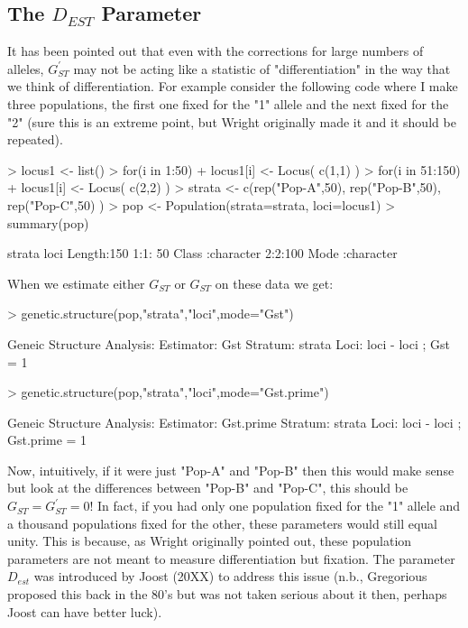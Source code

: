 \documentclass[letterpaper,twoside,openany]{book}
\begin{document}
\subsection{The $D_{EST}$ Parameter}

It has been pointed out that even with the corrections for large numbers of alleles, $G_{ST}^\prime$ may not be acting like a statistic of "differentiation" in the way that we think of differentiation.  For example consider the following code where I make three populations, the first one fixed for the "1" allele and the next fixed for the "2" (sure this is an extreme point, but Wright originally made it and it should be repeated).

\begin{Schunk}
\begin{Sinput}
> locus1 <- list()
> for(i in 1:50)
+ 	locus1[i] <- Locus( c(1,1) )
> for(i in 51:150)
+ 	locus1[i] <- Locus( c(2,2) )
> strata <- c(rep("Pop-A",50), rep("Pop-B",50), rep("Pop-C",50) )
> pop <- Population(strata=strata, loci=locus1)
> summary(pop)
\end{Sinput}
\begin{Soutput}
    strata           loci    
 Length:150         1:1: 50  
 Class :character   2:2:100  
 Mode  :character            
\end{Soutput}
\end{Schunk}

When we estimate either $G_{ST}$ or $G_{ST}$ on these data we get:

\begin{Schunk}
\begin{Sinput}
> genetic.structure(pop,"strata","loci",mode="Gst")
\end{Sinput}
\begin{Soutput}
Geneic Structure Analysis:
  Estimator: Gst 
  Stratum: strata 
  Loci: { loci }
   - loci ;  Gst = 1 
\end{Soutput}
\begin{Sinput}
> genetic.structure(pop,"strata","loci",mode="Gst.prime")
\end{Sinput}
\begin{Soutput}
Geneic Structure Analysis:
  Estimator: Gst.prime 
  Stratum: strata 
  Loci: { loci }
   - loci ;  Gst.prime = 1 
\end{Soutput}
\end{Schunk}

Now, intuitively, if it were just "Pop-A" and "Pop-B" then this would make sense but look at the differences between "Pop-B" and "Pop-C", this should be $G_{ST} = G_{ST}^\prime = 0$!  In fact, if you had only one population fixed for the "1" allele and a thousand populations fixed for the other, these parameters would still equal unity.  This is because, as Wright originally pointed out, these population parameters are not meant to measure differentiation but fixation.  The parameter $D_{est}$ was introduced by Joost (20XX) to address this issue (n.b., Gregorious proposed this back in the 80's but was not taken serious about it then, perhaps Joost can have better luck).
\end{document}

